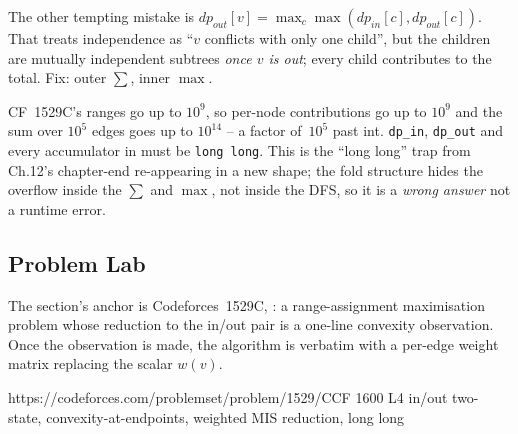 \begin{warningbox}
The other tempting mistake is $\mathit{dp}_{\mathit{out}}[v]=\max_c\max(
\mathit{dp}_{\mathit{in}}[c],\mathit{dp}_{\mathit{out}}[c])$. That treats
independence as ``$v$ conflicts with only one child'', but the children are
mutually independent subtrees \emph{once $v$ is out}; every child contributes
to the total. Fix: outer $\sum$, inner $\max$.
\end{warningbox}

\begin{warningbox}
CF~1529C's ranges go up to $10^{9}$, so per-node contributions go up to
$10^{9}$ and the sum over $10^{5}$ edges goes up to $10^{14}$ -- a factor
of~$10^{5}$ past int. \lstinline{dp_in}, \lstinline{dp_out} and every
accumulator in  must be \lstinline{long long}. This is
the ``long long'' trap from Ch.12's chapter-end re-appearing in a new
shape; the fold structure hides the overflow inside the $\sum$ and
$\max$, not inside the DFS, so it is a \emph{wrong answer} not a runtime
error.
\end{warningbox}

\subsection{Problem Lab}

The section's anchor is Codeforces~1529C, : a
range-assignment maximisation problem whose reduction to the in/out pair is
a one-line convexity observation. Once the observation is made, the
algorithm is  verbatim with a per-edge weight matrix
replacing the scalar $w(v)$.

  {https://codeforces.com/problemset/problem/1529/C}{CF 1600 L4}
  {in/out two-state, convexity-at-endpoints, weighted MIS reduction, long long}


